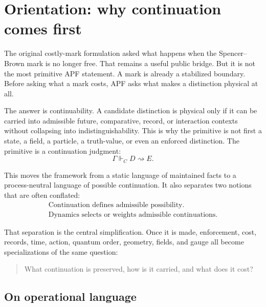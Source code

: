 \documentclass[11pt]{article}
\theoremstyle{remark}
\newcommand{\G}{\Gamma}
\newcommand{\entails}{\Vdash}
\newcommand{\goes}{\rightsquigarrow}
\begin{document}
\tableofcontents

\section{Orientation: why continuation comes first}

The original costly-mark formulation asked what happens when the Spencer--Brown mark is no longer free.  That remains a useful public bridge.  But it is not the most primitive APF statement.  A mark is already a stabilized boundary.  Before asking what a mark costs, APF asks what makes a distinction physical at all.

The answer is continuability.  A candidate distinction is physical only if it can be carried into admissible future, comparative, record, or interaction contexts without collapsing into indistinguishability.  This is why the primitive is not first a state, a field, a particle, a truth-value, or even an enforced distinction.  The primitive is a continuation judgment:
\[
        \G\entails_C D\goes E.
\]

This moves the framework from a static language of maintained facts to a process-neutral language of possible continuation.  It also separates two notions that are often conflated:
\[
\boxed{\begin{gathered}\text{Continuation defines admissible possibility.}\\ \text{Dynamics selects or weights admissible continuations.}\end{gathered}}
\]

That separation is the central simplification.  Once it is made, enforcement, cost, records, time, action, quantum order, geometry, fields, and gauge all become specializations of the same question:

\begin{quote}
What continuation is preserved, how is it carried, and what does it cost?
\end{quote}

\subsection*{On operational language}
\end{document}
